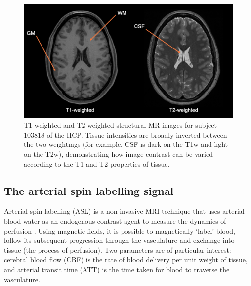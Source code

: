 \documentclass[12pt]{report}
\begin{document}

\begin{figure}[h]
\centering
\includegraphics[width = \textwidth]{t1t2.png}
\caption{T1-weighted and T2-weighted structural MR images for subject 103818 of the HCP. Tissue intensities are broadly inverted between the two weightings (for example, CSF is dark on the T1w and light on the T2w), demonstrating how image contrast can be varied according to the T1 and T2 properties of tissue.}
\label{t1t2_image}
\end{figure}


\subsection{The arterial spin labelling signal}

Arterial spin labelling (ASL) is a non-invasive MRI technique that uses arterial blood-water as an endogenous contrast agent to measure the dynamics of perfusion \cite{Alsop2015}. Using magnetic fields, it is possible to magnetically `label' blood, follow its subsequent progression through the vasculature and exchange into tissue (the process of perfusion). Two parameters are of particular interest: cerebral blood flow (CBF) is the rate of blood delivery per unit weight of tissue, and arterial transit time (ATT) is the time taken for blood to traverse the vasculature.  
\end{document}
